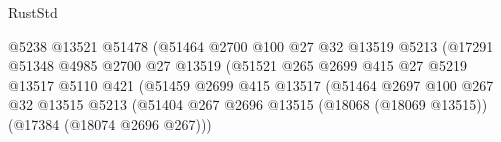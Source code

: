 \begin{lexlean}{RustStd}
\begin{coremodule}
                                                  @5238
                                                  @13521
                                                  @51478
                                                  (@51464
                                                    @2700
                                                    @100
                                                    @27
                                                    @32
                                                    @13519
                                                    @5213
                                                    (@17291
                                                      @51348
                                                      @4985
                                                      @2700
                                                      @27
                                                      @13519
                                                      (@51521
                                                        @265
                                                        @2699
                                                        @415
                                                        @27
                                                        @5219
                                                        @13517
                                                        @5110
                                                        @421
                                                        (@51459
                                                          @2699
                                                          @415
                                                          @13517
                                                          (@51464
                                                            @2697
                                                            @100
                                                            @267
                                                            @32
                                                            @13515
                                                            @5213
                                                            (@51404
                                                              @267
                                                              @2696
                                                              @13515
                                                              (@18068 (@18069 @13515))
                                                              (@17384 (@18074 @2696 @267)))

\end{coremodule}
\end{lexlean}
